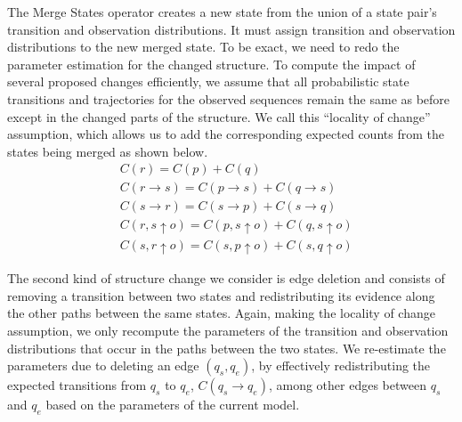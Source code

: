 \documentclass[letterpaper]{article}
\begin{document}
The Merge States operator creates a new state from the union of a state pair's transition and observation distributions.
It must assign transition and observation distributions to the new merged
state. To be exact, we need to redo the parameter estimation for the changed
structure. To compute the impact of several proposed changes efficiently,
we assume that all probabilistic state transitions and trajectories for
the observed sequences remain the same as before except in the changed
parts of the structure. We call this ``locality of change'' assumption, which
allows us to
add the corresponding expected counts from the states being merged as shown below. %
{\footnotesize
\begin{align}
&C(r) = C(p) + C(q) \nonumber\\
&C(r \rightarrow s) = C(p \rightarrow s) +  C(q \rightarrow s) \nonumber \\
&C(s \rightarrow r) = C(s \rightarrow p) +  C(s \rightarrow q) \nonumber \\
&C(r,s \uparrow o) = C(p,s \uparrow o) +  C(q,s \uparrow o) \nonumber \\
&C(s,r \uparrow o) = C(s,p \uparrow o) +  C(s,q \uparrow o) \nonumber
\end{align}
}%












The second kind of structure change we consider is edge deletion and consists of removing a transition between two states and
redistributing its evidence along the other paths between the same states.
Again, making the locality of change assumption, we only recompute
the parameters of the transition and observation distributions
that occur in the paths between the two states.
We re-estimate the parameters due to deleting an edge $(q_s,q_e)$,
by effectively redistributing the expected transitions from
$q_s$ to $q_e$, $C(q_s \rightarrow q_e)$,
among other edges between $q_s$ and $q_e$ based on the parameters of the current model.
\end{document}
